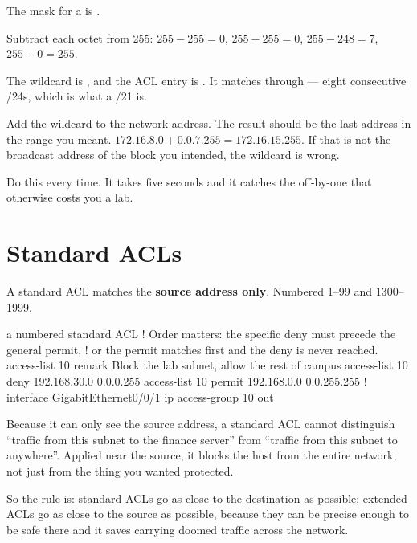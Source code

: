 \begin{worked}
The mask for a  is .

Subtract each octet from 255: $255-255=0$, $255-255=0$, $255-248=7$,
$255-0=255$.

The wildcard is , and the ACL entry is
. It matches  through
 --- eight consecutive /24s, which is what a /21 is.
\end{worked}

\begin{conceptbox}
Add the wildcard to the network address. The result should be the last address in
the range you meant. $172.16.8.0 + 0.0.7.255 = 172.16.15.255$. If that is not the
broadcast address of the block you intended, the wildcard is wrong.

Do this every time. It takes five seconds and it catches the off-by-one that
otherwise costs you a lab.
\end{conceptbox}

\section{Standard ACLs}

A standard ACL matches the \textbf{source address only}. Numbered 1--99 and
1300--1999.

\begin{config}{a numbered standard ACL}
! Order matters: the specific deny must precede the general permit,
! or the permit matches first and the deny is never reached.
access-list 10 remark Block the lab subnet, allow the rest of campus
access-list 10 deny   192.168.30.0 0.0.0.255
access-list 10 permit 192.168.0.0 0.0.255.255
!
interface GigabitEthernet0/0/1
 ip access-group 10 out
\end{config}

\begin{alertbox}
Because it can only see the source address, a standard ACL cannot distinguish
``traffic from this subnet to the finance server'' from ``traffic from this
subnet to anywhere''. Applied near the source, it blocks the host from the entire
network, not just from the thing you wanted protected.

So the rule is: standard ACLs go as close to the destination as possible;
extended ACLs go as close to the source as possible, because they can be precise
enough to be safe there and it saves carrying doomed traffic across the network.
\end{alertbox}

